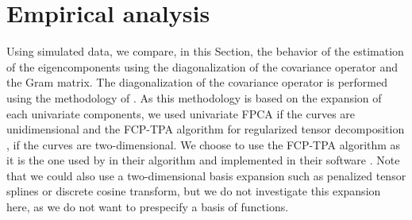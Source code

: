\section{Empirical analysis} %
\label{sec:empirical_analysis}

Using simulated data, we compare, in this Section, the behavior of the estimation of the eigencomponents using the diagonalization of the covariance operator and the Gram matrix. The diagonalization of the covariance operator is performed using the methodology of \cite{happMultivariateFunctionalPrincipal2015}. As this methodology is based on the expansion of each univariate components, we used univariate FPCA if the curves are unidimensional and the FCP-TPA algorithm for regularized tensor decomposition \citep{allenMultiwayFunctionalPrincipal2013a}, if the curves are two-dimensional. We choose to use the FCP-TPA algorithm as it is the one used by \cite{happMultivariateFunctionalPrincipal2015} in their algorithm and implemented in their software \citep{happ-kurzObjectOrientedSoftwareFunctional2020}. Note that we could also use a two-dimensional basis expansion such as penalized tensor splines or discrete cosine transform, but we do not investigate this expansion here, as we do not want to prespecify a basis of functions.

